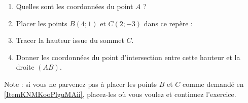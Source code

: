 
\begin{exercice}\label{exo2smath-0084}

\begin{center}
   
\end{center}

\begin{enumerate}
    \item
        Quelles sont les coordonnées du point \( A\) ?
    \item       \label{ItemKNMKooPlguMAii}
        Placer les points \( B(4;1)\) et \( C(2;-3)\) dans ce repère :
    \item
        Tracer la hauteur issue du sommet \( C \).
    \item
        Donner les coordonnées du point d'intersection entre cette hauteur et la droite \( (AB)\).
\end{enumerate}
Note : si vous ne parvenez pas à placer les points \( B\) et \( C\) comme demandé en \ref{ItemKNMKooPlguMAii}, placez-les où vous voulez et continuez l'exercice.

\end{exercice}
